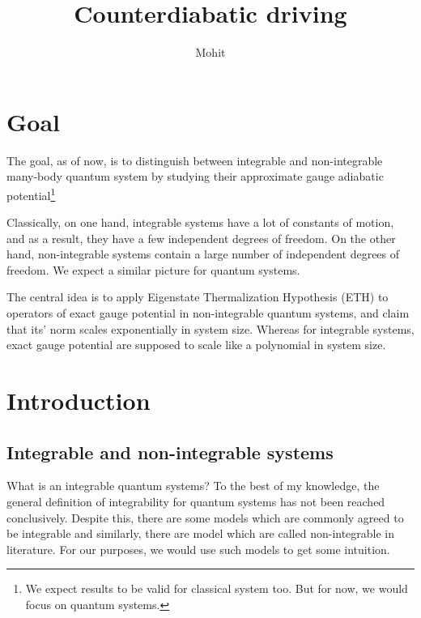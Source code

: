 \documentclass[11pt,a4paper]{article}
\author{Mohit}
\title{Counterdiabatic driving}
\begin{document}
\maketitle

\section{Goal}

The goal, as of now, is to distinguish between integrable and non-integrable many-body quantum system by studying their approximate gauge adiabatic potential\footnote{We expect results to be valid for classical system too. But for now, we would focus on quantum systems.}

 
Classically, on one hand, integrable systems have a lot of constants of motion, and as a result, they have a few independent degrees of freedom. On the other hand, non-integrable systems contain a large number of independent degrees of freedom. We expect a similar picture for quantum systems.

The central idea is to apply Eigenstate Thermalization Hypothesis (ETH) to operators of exact gauge potential in non-integrable quantum systems, and claim that its' norm scales exponentially in system 
size. Whereas for integrable systems, exact gauge potential are supposed to scale like a polynomial in system size.

\section{Introduction}
\subsection{Integrable and non-integrable systems}
What is an integrable quantum systems? To the best of my knowledge, the general definition of integrability for quantum systems has not been reached conclusively. Despite this, there are some models which are commonly agreed to be integrable and similarly, there are model which are called non-integrable in literature. For our purposes, we would use such models to get some intuition.
\end{document}
